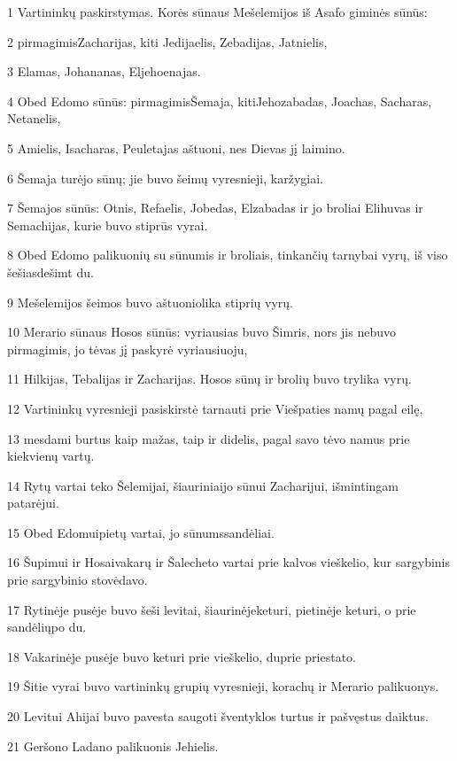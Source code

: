 \par 1 Vartininkų paskirstymas. Korės sūnaus Mešelemijos iš Asafo giminės sūnūs: 
\par 2 pirmagimis­Zacharijas, kiti­ Jedijaelis, Zebadijas, Jatnielis, 
\par 3 Elamas, Johananas, Eljehoenajas. 
\par 4 Obed Edomo sūnūs: pirmagimis­Šemaja, kiti­Jehozabadas, Joachas, Sacharas, Netanelis, 
\par 5 Amielis, Isacharas, Peuletajas­ aštuoni, nes Dievas jį laimino. 
\par 6 Šemaja turėjo sūnų; jie buvo šeimų vyresnieji, karžygiai. 
\par 7 Šemajos sūnūs: Otnis, Refaelis, Jobedas, Elzabadas ir jo broliai Elihuvas ir Semachijas, kurie buvo stiprūs vyrai. 
\par 8 Obed Edomo palikuonių su sūnumis ir broliais, tinkančių tarnybai vyrų, iš viso šešiasdešimt du. 
\par 9 Mešelemijos šeimos buvo aštuoniolika stiprių vyrų. 
\par 10 Merario sūnaus Hosos sūnūs: vyriausias buvo Šimris, nors jis nebuvo pirmagimis, jo tėvas jį paskyrė vyriausiuoju, 
\par 11 Hilkijas, Tebalijas ir Zacharijas. Hosos sūnų ir brolių buvo trylika vyrų. 
\par 12 Vartininkų vyresnieji pasiskirstė tarnauti prie Viešpaties namų pagal eilę, 
\par 13 mesdami burtus kaip mažas, taip ir didelis, pagal savo tėvo namus prie kiekvienų vartų. 
\par 14 Rytų vartai teko Šelemijai, šiauriniai­jo sūnui Zacharijui, išmintingam patarėjui. 
\par 15 Obed Edomui­pietų vartai, jo sūnums­sandėliai. 
\par 16 Šupimui ir Hosai­vakarų ir Šalecheto vartai prie kalvos vieškelio, kur sargybinis prie sargybinio stovėdavo. 
\par 17 Rytinėje pusėje buvo šeši levitai, šiaurinėje­keturi, pietinėje­ keturi, o prie sandėlių­po du. 
\par 18 Vakarinėje pusėje buvo keturi prie vieškelio, du­prie priestato. 
\par 19 Šitie vyrai buvo vartininkų grupių vyresnieji, korachų ir Merario palikuonys. 
\par 20 Levitui Ahijai buvo pavesta saugoti šventyklos turtus ir pašvęstus daiktus. 
\par 21 Geršono Ladano palikuonis­ Jehielis. 
